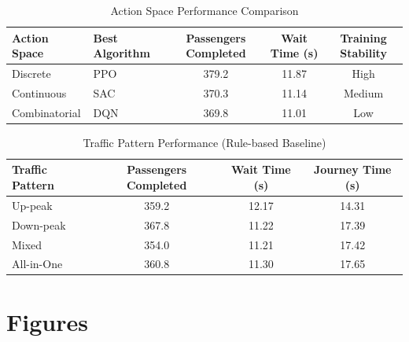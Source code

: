 \documentclass[10pt,twocolumn]{article}
\begin{document}
\begin{table}[h!]
\centering
\caption{Action Space Performance Comparison}
\label{tab:action-space-performance}
\begin{tabular}{l l c c c}
\hline
Action Space & Best Algorithm & Passengers Completed & Wait Time (s) & Training Stability \\
\hline
Discrete & PPO & 379.2 & 11.87 & High \\
Continuous & SAC & 370.3 & 11.14 & Medium \\
Combinatorial & DQN & 369.8 & 11.01 & Low \\
\hline
\end{tabular}
\end{table}

\begin{table}[h!]
\centering
\caption{Traffic Pattern Performance (Rule-based Baseline)}
\label{tab:traffic-pattern-performance}
\begin{tabular}{l c c c}
\hline
Traffic Pattern & Passengers Completed & Wait Time (s) & Journey Time (s) \\
\hline
Up-peak & 359.2 & 12.17 & 14.31 \\
Down-peak & 367.8 & 11.22 & 17.39 \\
Mixed & 354.0 & 11.21 & 17.42 \\
All-in-One & 360.8 & 11.30 & 17.65 \\
\hline
\end{tabular}
\end{table}

\clearpage                %

\section{Figures}
\FloatBarrier             %
\end{document}
